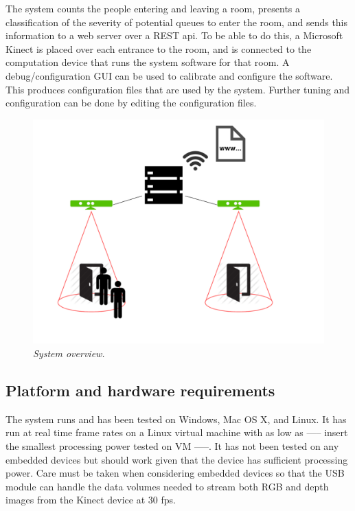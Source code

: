 The system counts the people entering and leaving a room, presents a classification of the severity of potential queues to enter the room, and sends this information to a web server over a REST api. To be able to do this, a Microsoft Kinect is placed over each entrance to the room, and is connected to the computation device that runs the system software for that room. A debug/configuration GUI can be used to calibrate and configure the software. This produces configuration files that are used by the system. Further tuning and configuration can be done by editing the configuration files. 

\begin{figure}[htb]
	\centering
	\includegraphics[width=\linewidth]{images/system_overview.pdf}
	\caption[Overview of the entire system]{\textit{System overview.}}
	\label{fig:system_overview}  %
\end{figure}

\subsection{Platform and hardware requirements}
The system runs and has been tested on Windows, Mac OS X, and Linux. It has  run at real time frame rates on a Linux virtual machine with as low as ----- insert the smallest processing power tested on VM -----. It has not been tested on any embedded devices but should work given that the device has sufficient processing power. Care must be taken when considering embedded devices so that the USB module can handle the data volumes needed to stream both RGB and depth images from the Kinect device at 30 fps. 

